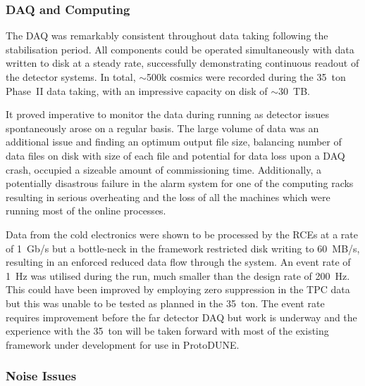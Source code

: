 \subsubsection{DAQ and Computing}\label{sec:35tonPhaseIIOutcomesDAQ}

The DAQ was remarkably consistent throughout data taking following the stabilisation period.  All components could be operated simultaneously with data written to disk at a steady rate, successfully demonstrating continuous readout of the detector systems.  In total, $\sim$500k cosmics were recorded during the 35~ton Phase~II data taking, with an impressive capacity on disk of $\sim$30~TB.

It proved imperative to monitor the data during running as detector issues spontaneously arose on a regular basis.  The large volume of data was an additional issue and finding an optimum output file size, balancing number of data files on disk with size of each file and potential for data loss upon a DAQ crash, occupied a sizeable amount of commissioning time.  Additionally, a potentially disastrous failure in the alarm system for one of the computing racks resulting in serious overheating and the loss of all the machines which were running most of the online processes.

Data from the cold electronics were shown to be processed by the RCEs at a rate of 1~Gb/s but a bottle-neck in the framework restricted disk writing to 60~MB/s, resulting in an enforced reduced data flow through the system.  An event rate of 1~Hz was utilised during the run, much smaller than the design rate of 200~Hz.  This could have been improved by employing zero suppression in the TPC data but this was unable to be tested as planned in the 35~ton.  The event rate requires improvement before the far detector DAQ but work is underway and the experience with the 35~ton will be taken forward with most of the existing framework under development for use in ProtoDUNE.

\subsubsection{Noise Issues}\label{sec:35tonPhaseIIOutcomesNoise}

